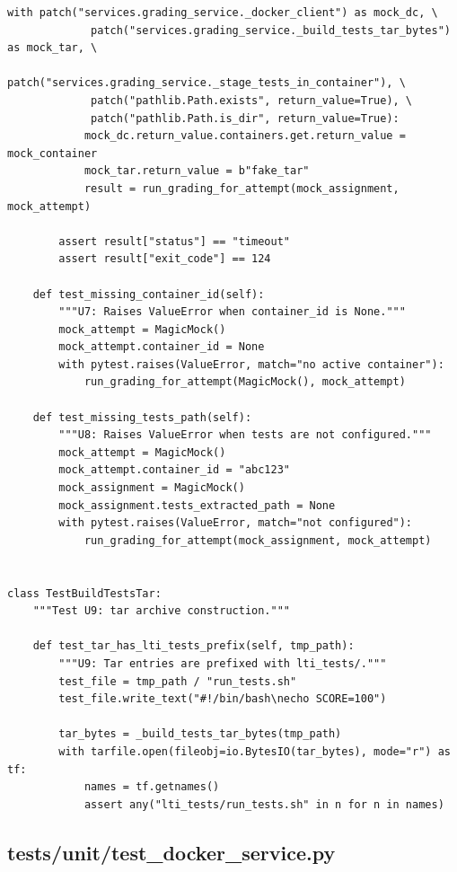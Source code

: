 \documentclass[12pt, letterpaper]{article}
\begin{document}
\begin{lstlisting}[style=pythonstyle]
        with patch("services.grading_service._docker_client") as mock_dc, \
             patch("services.grading_service._build_tests_tar_bytes") as mock_tar, \
             patch("services.grading_service._stage_tests_in_container"), \
             patch("pathlib.Path.exists", return_value=True), \
             patch("pathlib.Path.is_dir", return_value=True):
            mock_dc.return_value.containers.get.return_value = mock_container
            mock_tar.return_value = b"fake_tar"
            result = run_grading_for_attempt(mock_assignment, mock_attempt)

        assert result["status"] == "timeout"
        assert result["exit_code"] == 124

    def test_missing_container_id(self):
        """U7: Raises ValueError when container_id is None."""
        mock_attempt = MagicMock()
        mock_attempt.container_id = None
        with pytest.raises(ValueError, match="no active container"):
            run_grading_for_attempt(MagicMock(), mock_attempt)

    def test_missing_tests_path(self):
        """U8: Raises ValueError when tests are not configured."""
        mock_attempt = MagicMock()
        mock_attempt.container_id = "abc123"
        mock_assignment = MagicMock()
        mock_assignment.tests_extracted_path = None
        with pytest.raises(ValueError, match="not configured"):
            run_grading_for_attempt(mock_assignment, mock_attempt)


class TestBuildTestsTar:
    """Test U9: tar archive construction."""

    def test_tar_has_lti_tests_prefix(self, tmp_path):
        """U9: Tar entries are prefixed with lti_tests/."""
        test_file = tmp_path / "run_tests.sh"
        test_file.write_text("#!/bin/bash\necho SCORE=100")

        tar_bytes = _build_tests_tar_bytes(tmp_path)
        with tarfile.open(fileobj=io.BytesIO(tar_bytes), mode="r") as tf:
            names = tf.getnames()
            assert any("lti_tests/run_tests.sh" in n for n in names)
\end{lstlisting}

\subsection{tests/unit/test\_docker\_service.py}
\end{document}
